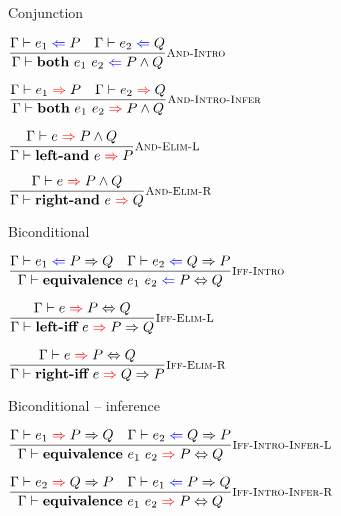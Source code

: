 \documentclass{beamer}
\begin{document}
\begin{frame}{Conjunction}

\begin{center}
  $\infrule[And-Intro]{\proofcheck{e_1}{P} \quad \proofcheck{e_2}{Q}}{\proofcheck{\andintro{e_1}{e_2}}{\And{P}{Q}}}$

  \vspace{2em}

  $\infrule[And-Intro-Infer]{\proofinfer{e_1}{P} \quad \proofinfer{e_2}{Q}}{\proofinfer{\andintro{e_1}{e_2}}{\And{P}{Q}}}$

  \vspace{2em}

  $\infrule[And-Elim-L]{\proofinfer{e}{\And{P}{Q}}}{\proofinfer{\andeliml{e}}{P}}$

  \vspace{2em}

  $\infrule[And-Elim-R]{\proofinfer{e}{\And{P}{Q}}}{\proofinfer{\andelimr{e}}{Q}}$
\end{center}

\end{frame}

\begin{frame}{Biconditional}

\begin{center}
  $\infrule[Iff-Intro]{\proofcheck{e_1}{\Impl{P}{Q}} \quad \proofcheck{e_2}{\Impl{Q}{P}}}{\proofcheck{\iffintro{e_1}{e_2}}{\Iff{P}{Q}}}$

  \vspace{2em}

  $\infrule[Iff-Elim-L]{\proofinfer{e}{\Iff{P}{Q}}}{\proofinfer{\iffeliml{e}}{\Impl{P}{Q}}}$

  \vspace{2em}

  $\infrule[Iff-Elim-R]{\proofinfer{e}{\Iff{P}{Q}}}{\proofinfer{\iffelimr{e}}{\Impl{Q}{P}}}$
\end{center}

\end{frame}

\begin{frame}{Biconditional -- inference}

\begin{center}
  $\infrule[Iff-Intro-Infer-L]{\proofinfer{e_1}{\Impl{P}{Q}} \quad \proofcheck{e_2}{\Impl{Q}{P}}}{\proofinfer{\iffintro{e_1}{e_2}}{\Iff{P}{Q}}}$

  \vspace{2em}

  $\infrule[Iff-Intro-Infer-R]{\proofinfer{e_2}{\Impl{Q}{P}} \quad \proofcheck{e_1}{\Impl{P}{Q}}}{\proofinfer{\iffintro{e_1}{e_2}}{\Iff{P}{Q}}}$
\end{center}

\end{frame}
\end{document}
